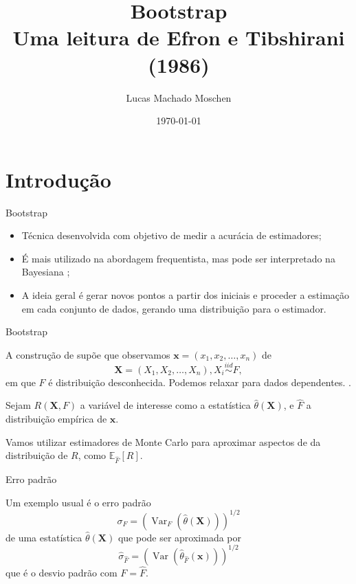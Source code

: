 \documentclass{beamer}
\title[Bootstrap]
{Bootstrap \\ \small Uma leitura de Efron e Tibshirani (1986)}
\author[Lucas]
{      
    Lucas Machado Moschen
}
\institute[]
{
  Escola de Matemática Aplicada \\
  Fundação Getulio Vargas
}
\date[\today]
{\today}
\newcommand{\ev}{\mathbb{E}}
\newcommand{\var}{\operatorname{Var}}
\begin{document}
\frame{\titlepage}

\section{Introdução}

\begin{frame}{Bootstrap}
    \begin{itemize}
        \item Técnica desenvolvida com objetivo de medir a acurácia de
        estimadores; 

        \bigskip

        \item É mais utilizado na abordagem frequentista, mas pode ser
        interpretado na Bayesiana \cite[]{rubin1981bayesian};

        \bigskip

        \item A ideia geral é gerar novos pontos a partir dos iniciais e
        proceder a estimação em cada conjunto de dados, gerando uma
        distribuição para o estimador.
    \end{itemize}
\end{frame}

\begin{frame}{Bootstrap}

    A construção de \cite{Efron1986} supõe que observamos $\boldsymbol{x} = (x_1, x_2,
    \dots, x_n)$ de 
    $$
    \boldsymbol{X} = (X_1, X_2, \dots, X_n), X_i \overset{iid}{\sim} F, 
    $$
    em que $F$ é distribuição desconhecida. Podemos relaxar para dados dependentes.
    \cite[]{lahiri1999theoretical}.
    
    \bigskip\pause
    
    Sejam $R(\boldsymbol{X}, F)$ a variável de interesse como a estatística
    $\hat{\theta}(\boldsymbol{X})$, e $\hat{F}$ a distribuição empírica de
    $\boldsymbol{x}$.
    
    \bigskip\pause
    
    Vamos utilizar estimadores de Monte Carlo para aproximar aspectos de da
    distribuição de $R$, como $\ev_{\hat{F}}[R]$.

\end{frame}

\begin{frame}{Erro padrão}

    Um exemplo usual é o erro padrão
    $$\sigma_F = \left(\var_F(\hat{\theta}(\boldsymbol{X}))\right)^{1/2}$$
    de uma estatística $\hat{\theta}(\boldsymbol{X})$ 
    que pode ser aproximada por 
    $$
    \hat{\sigma}_{\hat{F}} = \left(\var(\hat{\theta}_
    {\hat{F}}(\boldsymbol{x}))\right)^{1/2}
    $$
    que é o desvio padrão com $F = \hat{F}$. 
    
\end{frame}
\end{document}
